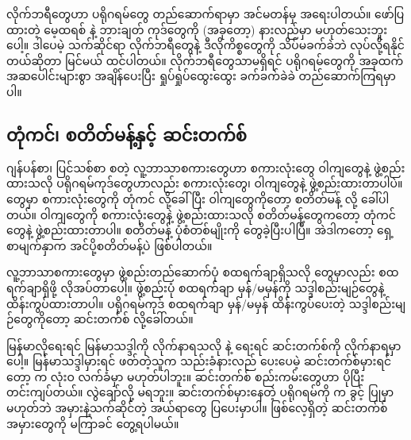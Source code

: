 \begin{figure}[tbh!]
\caption{} 
\label{fig:}
\end{figure}

လိုက်ဘရီတွေဟာ ပရိုဂရမ်တွေ တည်ဆောက်ရာမှာ အင်မတန်မှ အရေးပါတယ်။ ဖော်ပြထားတဲ့ မေ့ထရစ် နဲ့ ဘားချတ်  ကုဒ်တွေကို (အခုတော့) နားလည်မှာ မဟုတ်သေးဘူးပေါ့။ ဒါပေမဲ့ သက်ဆိုင်ရာ လိုက်ဘရီတွေနဲ့ ဒီလိုကိစ္စတွေကို သိပ်မခက်ခဲဘဲ လုပ်လို့ရနိုင်တယ်ဆိုတာ မြင်မယ် ထင်ပါတယ်။ လိုက်ဘရီတွေသာမရှိရင် ပရိုဂရမ်တွေကို အခုထက် အဆပေါင်းများစွာ အချိန်ပေးပြီး ရှုပ်ရှုပ်ထွေးထွေး ခက်ခက်ခဲခဲ တည်ဆောက်ကြရမှာပါ။ 


\subsection*{တုံကင်၊ စတိတ်မန့်နှင့် ဆင်းတက်စ်}
ဂျန်ပန်စာ၊ ပြင်သစ်စာ စတဲ့ လူ့ဘာသာစကားတွေဟာ  စကားလုံးတွေ ဝါကျတွေနဲ့ ဖွဲ့စည်းထားသလို ပရိုဂရမ်ကုဒ်တွေဟာလည်း စကားလုံးတွေ၊ ဝါကျတွေနဲ့ ဖွဲ့စည်းထားတာပါပဲ။  တွေမှာ စကားလုံးတွေကို တုံကင်  လို့ခေါ်ပြီး  ဝါကျတွေကိုတော့ စတိတ်မန့်  လို့ ခေါ်ပါတယ်။ ဝါကျတွေကို စကားလုံးတွေနဲ့ ဖွဲ့စည်းထားသလို စတိတ်မန့်တွေကတော့ တုံကင်တွေနဲ့ ဖွဲ့စည်းထားတာပါ။ စတိတ်မန့် ပုံစံတစ်မျိုးကို တွေခဲ့ပြီးပါပြီ။ အဲဒါကတော့ ရှေ့စာမျက်နှာက အင်ပို့စတိတ်မန့်ပဲ ဖြစ်ပါတယ်။ 

လူ့ဘာသာစကားတွေမှာ ဖွဲ့စည်းတည်ဆောက်ပုံ စထရက်ချာရှိသလို  တွေမှာလည်း စထရက်ချာရှိဖို့ လိုအပ်တာပေါ့။  ဖွဲ့စည်းပုံ စထရက်ချာ မှန်/မမှန်ကို သဒ္ဒါစည်းမျဉ်တွေနဲ့ ထိန်းကွပ်ထားတာပါ။ ပရိုဂရမ်ကုဒ် စထရက်ချာ မှန်/မမှန် ထိန်းကွပ်ပေးတဲ့ သဒ္ဒါစည်းမျဉ်တွေကိုတော့ ဆင်းတက်စ်  လို့ခေါ်တယ်။

မြန်မာလိုရေးရင် မြန်မာသဒ္ဒါကို လိုက်နာရသလို  နဲ့ ရေးရင်  ဆင်းတက်စ်ကို လိုက်နာရမှာပေါ့။ မြန်မာသဒ္ဒါမှားရင် ဖတ်တဲ့သူက သည်းခံနားလည် ပေးပေမဲ့ ဆင်းတက်စ်မှားရင်တော့  က လုံးဝ လက်ခံမှာ မဟုတ်ပါဘူး။ ဆင်းတက်စ် စည်းကမ်းတွေဟာ ပိုပြီး တင်းကျပ်တယ်။ လွဲချော်လို့ မရဘူး။ ဆင်းတက်စ်မှားနေတဲ့ ပရိုဂရမ်ကို   က  ခွင့် ပြုမှာမဟုတ်ဘဲ အမှားနဲ့သက်ဆိုင်တဲ့ အယ်ရာတွေ ပြပေးမှာပါ။ ဖြစ်လေ့ရှိတဲ့ ဆင်းတက်စ်အမှားတွေကို မကြာခင် တွေ့ရပါမယ်။

